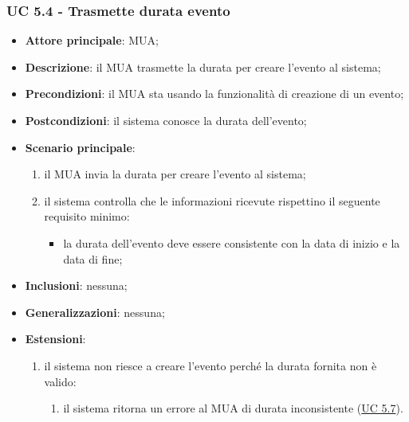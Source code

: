     \subsubsection{UC 5.4 - Trasmette durata evento} \label{sec:UC5.4}
    \begin{itemize}
        \item \textbf{Attore principale}: MUA;
        \item \textbf{Descrizione}: il MUA trasmette la durata per creare l'evento al sistema;
        \item \textbf{Precondizioni}: il MUA sta usando la funzionalità di creazione di un evento;
        \item \textbf{Postcondizioni}: il sistema conosce la durata dell'evento;
        \item \textbf{Scenario principale}:
            \begin{enumerate}
                \item il MUA invia la durata per creare l'evento al sistema;
                \item il sistema controlla che le informazioni ricevute rispettino il seguente requisito minimo:
                    \begin{itemize}
                        \item la durata dell'evento deve essere consistente con la data di inizio e la data di fine;
                    \end{itemize}
            \end{enumerate}
        \item \textbf{Inclusioni}: nessuna;
        \item \textbf{Generalizzazioni}: nessuna;
        \item \textbf{Estensioni}:
            \begin{enumerate}[label=\alph*.]
                \item il sistema non riesce a creare l'evento perché la durata fornita non è valido:
                \begin{enumerate}[label=\arabic*.]
                    \item il sistema ritorna un errore al MUA di durata inconsistente (\hyperref[sec:UC5.7]{UC 5.7}).
                \end{enumerate}
            \end{enumerate}
    \end{itemize}


